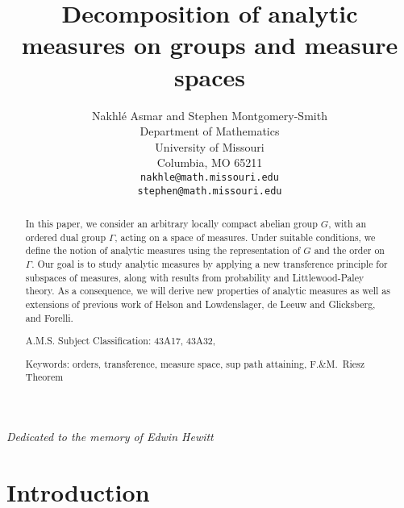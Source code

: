 \documentclass[12pt,leqno]{article}
\begin{document}
\title{Decomposition of analytic measures on groups and measure spaces}
\author{Nakhl\'e Asmar and Stephen Montgomery-Smith\\
Department of Mathematics\\
University of Missouri\\
Columbia, MO 65211\\
{\tt nakhle@math.missouri.edu}\\
{\tt stephen@math.missouri.edu}}
\date{}

\maketitle

\begin{center}
{\em Dedicated to the memory of Edwin Hewitt}
\end{center}


\newtheorem{defin}{Definition}[section]
\newtheorem{thm}[defin]{Theorem}
\newtheorem{ex}[defin]{Example}
\newtheorem{prop}[defin]{Proposition}
\newtheorem{lemma}[defin]{Lemma}
\newtheorem{schol}[defin]{Scholium}
\newtheorem{rem}[defin]{Remarks}
\newtheorem{cor}[defin]{Corollary}

\begin{abstract}
In this paper, we consider an arbitrary locally compact
abelian group $G$, with an ordered dual group $\Gamma$,
acting on a space of measures.  
Under suitable conditions, we define the notion of 
analytic measures using the representation of $G$ and the order on $\Gamma$.  
Our goal is to study analytic measures by applying a new  transference principle for subspaces of measures, along with  results from probability and Littlewood-Paley theory.  As a consequence,  
we will derive new properties of analytic measures 
 as well as extensions of previous work of Helson and Lowdenslager, de Leeuw and Glicksberg, and Forelli.

A.M.S. Subject Classification:  43A17, 43A32,  

Keywords: orders, transference, measure space, sup path attaining, 
F.\&M.\ Riesz Theorem
\end{abstract}


\section{Introduction}
\end{document}
